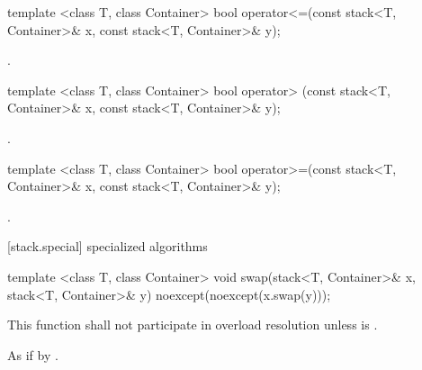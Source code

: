 %
\begin{itemdecl}
template <class T, class Container>
  bool operator<=(const stack<T, Container>& x, const stack<T, Container>& y);
\end{itemdecl}

\begin{itemdescr}
\pnum
\returns
{}.
\end{itemdescr}

%
\begin{itemdecl}
template <class T, class Container>
  bool operator> (const stack<T, Container>& x, const stack<T, Container>& y);
\end{itemdecl}

\begin{itemdescr}
\pnum
\returns
{}.
\end{itemdescr}

%
\begin{itemdecl}
template <class T, class Container>
    bool operator>=(const stack<T, Container>& x, const stack<T, Container>& y);
\end{itemdecl}

\begin{itemdescr}
\pnum
\returns
{}.
\end{itemdescr}

[stack.special]{ specialized algorithms}

%
%
\begin{itemdecl}
template <class T, class Container>
  void swap(stack<T, Container>& x, stack<T, Container>& y) noexcept(noexcept(x.swap(y)));
\end{itemdecl}

\begin{itemdescr}
\pnum
\remarks
This function shall not participate in overload resolution
unless  is .

\pnum
\effects As if by .
\end{itemdescr}
